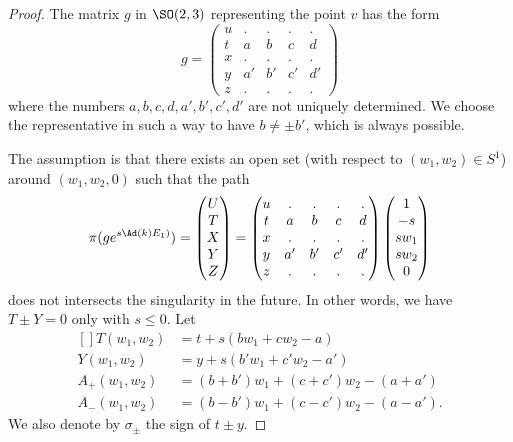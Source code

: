 \begin{proof}
The matrix $g$ in $\SO(2,3)$ representing the point $v$ has the form
\begin{equation}
	g=\begin{pmatrix}
 u	&	.	&	.	&	.	&	.\\ 
 t	&	a	&	b	&	c	&	d\\ 
 x	&	.	&	.	&	.	&	.\\ 
 y	&	a'	&	b'	&	c'	&	d'\\ 
z	&	.	&	.	&	.	&	. 
 \end{pmatrix}
\end{equation}
where the numbers $a,b,c,d,a',b',c',d'$ are not uniquely determined. We choose the representative in such a way to have $b\neq \pm b'$, which is always possible.

The assumption is that there exists an open set (with respect to $(w_1,w_2)\in S^1$) around $(w_1,w_2,0)$ such that the path
\begin{equation}		\label{EqPathgexpUTXYZ}
	\pi(g e^{s\Ad\left( k \right)E_1)})=
	\begin{pmatrix}
		U	\\ 
		T	\\ 
		X	\\ 
		Y	\\ 
		Z	
	\end{pmatrix}=
	\begin{pmatrix}
 u	&	.	&	.	&	.	&	.\\ 
 t	&	a	&	b	&	c	&	d\\ 
 x	&	.	&	.	&	.	&	.\\ 
 y	&	a'	&	b'	&	c'	&	d'\\ 
z	&	.	&	.	&	.	&	. 
 \end{pmatrix}
 \begin{pmatrix}
	 1	\\ 
	 -s	\\ 
	 sw_1	\\ 
	 sw_2	\\ 
	 0	
 \end{pmatrix}
\end{equation}
does not intersects the singularity in the future. In other words, we have $T\pm Y=0$ only with $s\leq 0$. Let
\begin{equation}
	\begin{aligned}[]
		T(w_1,w_2)&=t+s(bw_1+cw_2-a)\\
		Y(w_1,w_2)&=y+s(b'w_1+c'w_2-a')\\
		A_+(w_1,w_2)&=(b+b')w_1+(c+c')w_2-(a+a')\\
		A_-(w_1,w_2)&=(b-b')w_1+(c-c')w_2-(a-a').
	\end{aligned}
\end{equation}
We also denote by $\sigma_{\pm}$ the sign of $t\pm y$.


\end{proof}
